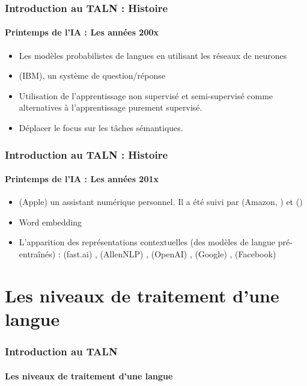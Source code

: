\documentclass{beamer}
\begin{document}
\begin{frame}
\frametitle{Introduction au TALN : Histoire}
\framesubtitle{Printemps de l'IA : Les années 200x}

\begin{itemize}
	\item {} Les modèles probabilistes de langues en utilisant les réseaux de neurones \cite{2003-bengio-al}
	\item {}  (IBM), un système de question/réponse
	\item Utilisation de l'apprentissage non supervisé et semi-supervisé comme alternatives à l'apprentissage purement supervisé.
	\item Déplacer le focus sur les tâches sémantiques.
\end{itemize}

\end{frame}

\begin{frame}
\frametitle{Introduction au TALN : Histoire}
\framesubtitle{Printemps de l'IA : Les années 201x}

\begin{itemize}
	\item {}  (Apple)  un assistant numérique personnel. Il a été suivi par  (Amazon, ) et  ()
	\item {} Word embedding \cite{2014-lebret-collobert}
	\item {} L'apparition des représentations contextuelles (des modèles de langue pré-entraînés) :  (fast.ai) \cite{2018-howard-ruder},  (AllenNLP) \cite{2018-peters-al},  (OpenAI) \cite{2018-radford-al},  (Google) \cite{2018-devlin-al},  (Facebook) \cite{2019-lample-conneau}
\end{itemize}

\end{frame}

\section{Les niveaux de traitement d'une langue}

\begin{frame}
\frametitle{Introduction au TALN}
\framesubtitle{Les niveaux de traitement d'une langue}


\end{frame}
\end{document}
